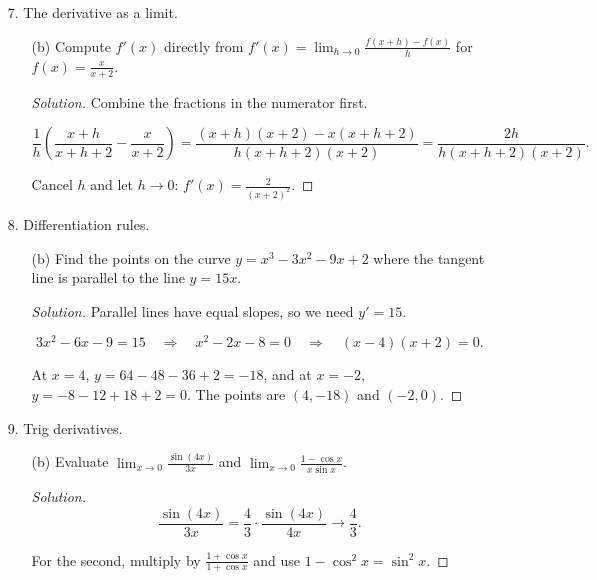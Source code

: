 \documentclass[12pt]{article}
\newcommand\parens[1]{\left( #1 \right)}
\newenvironment{solution}
  {\renewcommand\qedsymbol{$\blacksquare$}\begin{proof}[Solution]}
  {\end{proof}}
\begin{document}
\begin{enumerate}
\begin{enumerate}
\begin{solution}
\[a + b = 2, \qquad 4a + b = 8.\]

Subtracting, $3a = 6$, so $a = 2$ and $b = 0$. The middle piece is $2x$.
\end{solution}
\end{enumerate}
\item[7.] The derivative as a limit.
\begin{enumerate}
\item[(b)] Compute $f'(x)$ directly from $f'(x) = \lim_{h \to 0} \frac{f(x+h)-f(x)}{h}$ for $f(x) = \frac{x}{x+2}$.
\begin{solution}
Combine the fractions in the numerator first.

\[\frac{1}{h}\parens{\frac{x+h}{x+h+2}-\frac{x}{x+2}} = \frac{(x+h)(x+2) - x(x+h+2)}{h(x+h+2)(x+2)} = \frac{2h}{h(x+h+2)(x+2)}.\]

Cancel $h$ and let $h\to0$: $f'(x) = \frac{2}{(x+2)^2}$.
\end{solution}
\end{enumerate}
\item[8.] Differentiation rules.
\begin{enumerate}
\item[(b)] Find the points on the curve $y = x^3 - 3x^2 - 9x + 2$ where the tangent line is parallel to the line $y = 15x$.
\begin{solution}
Parallel lines have equal slopes, so we need $y' = 15$.

\[3x^2 - 6x - 9 = 15 \quad\Longrightarrow\quad x^2 - 2x - 8 = 0 \quad\Longrightarrow\quad (x-4)(x+2) = 0.\]

At $x = 4$, $y = 64 - 48 - 36 + 2 = -18$, and at $x=-2$, $y = -8 - 12 + 18 + 2 = 0$. The points are $(4,-18)$ and $(-2,0)$.
\end{solution}
\end{enumerate}
\item[9.] Trig derivatives.
\begin{enumerate}
\item[(b)] Evaluate $\lim_{x \to 0} \frac{\sin(4x)}{3x}$ and $\lim_{x \to 0} \frac{1-\cos x}{x\sin x}$.
\begin{solution}
\[\frac{\sin(4x)}{3x} = \frac43\cdot\frac{\sin(4x)}{4x} \longrightarrow \frac43.\]

For the second, multiply by $\frac{1+\cos x}{1+\cos x}$ and use $1-\cos^2 x = \sin^2 x$.


\end{solution}
\end{enumerate}
\end{enumerate}
\end{document}
